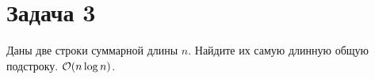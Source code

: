 \section{Задача 3}
Даны две строки суммарной длины $n$. Найдите их самую длинную общую подстроку. $\mathcal{O}(n \log n)$.
